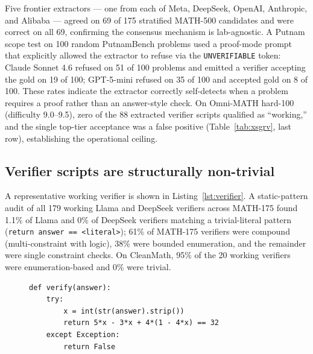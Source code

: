 \documentclass{article}
\begin{document}
Five frontier extractors --- one from each of Meta, DeepSeek, OpenAI, Anthropic, and Alibaba --- agreed on 69 of 175 stratified MATH-500 candidates and were correct on all 69, confirming the consensus mechanism is lab-agnostic. A Putnam scope test on 100 random PutnamBench problems used a proof-mode prompt that explicitly allowed the extractor to refuse via the \texttt{UNVERIFIABLE} token: Claude Sonnet 4.6 refused on 51 of 100 problems and emitted a verifier accepting the gold on 19 of 100; GPT-5-mini refused on 35 of 100 and accepted gold on 8 of 100. These rates indicate the extractor correctly self-detects when a problem requires a proof rather than an answer-style check. On Omni-MATH hard-100 (difficulty 9.0--9.5), zero of the 88 extracted verifier scripts qualified as ``working,'' and the single top-tier acceptance was a false positive (Table~\ref{tab:xsgrv}, last row), establishing the operational ceiling.

\subsection{Verifier scripts are structurally non-trivial}

A representative working verifier is shown in Listing~\ref{lst:verifier}. A static-pattern audit of all 179 working Llama and DeepSeek verifiers across MATH-175 found 1.1\% of Llama and 0\% of DeepSeek verifiers matching a trivial-literal pattern (\texttt{return answer == <literal>}); 61\% of MATH-175 verifiers were compound (multi-constraint with logic), 38\% were bounded enumeration, and the remainder were single constraint checks. On CleanMath, 95\% of the 20 working verifiers were enumeration-based and 0\% were trivial.

\begin{figure}[t]
\begin{lstlisting}[style=xsgrv,caption={\textbf{Representative X-SGRV verifier emitted by Llama-3.3-70B for a MATH-500 linear-equation problem.} The extracted function re-derives the constraint from the problem statement and substitutes the candidate; SymPy plus standard library (\texttt{itertools}, \texttt{math}, \texttt{Fraction}, \texttt{Counter}) are pre-imported in the sandbox. Execution timeout: 10 s wall-clock per call.},label={lst:verifier}]
def verify(answer):
    try:
        x = int(str(answer).strip())
        return 5*x - 3*x + 4*(1 - 4*x) == 32
    except Exception:
        return False
\end{lstlisting}
\end{figure}
\end{document}
